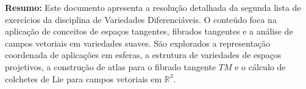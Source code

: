 \begin{center}
\end{center}
\begin{tcolorbox}[
	enhanced,
	sharp corners,
	boxrule=0.5pt,
	colback=white, 
	colframe=black,         
	width=1\textwidth,
	]%
	\textbf{Resumo:} Este documento apresenta a resolução detalhada da segunda lista de exercícios da disciplina de Variedades Diferenciáveis. O conteúdo foca na aplicação de conceitos de espaços tangentes, fibrados tangentes e a análise de campos vetoriais em variedades suaves. São explorados a representação coordenada de aplicações em esferas, a estrutura de variedades de espaços projetivos, a construção de atlas para o fibrado tangente $TM$ e o cálculo de colchetes de Lie para campos vetoriais em $\mathbb{R}^3$.
\end{tcolorbox}
